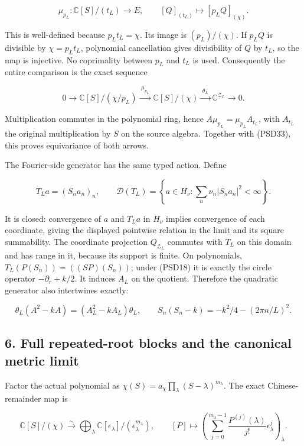 \[
\mu_{p_L}:\mathbb{C}[S]/(t_L)\longrightarrow E,
\qquad [Q]_{(t_L)}\longmapsto[p_LQ]_{(\chi)}.
\tag{PSD33a}
\]

This is well-defined because \(p_L t_L=\chi\). Its image is \((p_L)/(\chi)\). If \(p_LQ\) is divisible by \(\chi=p_Lt_L\), polynomial cancellation gives divisibility of \(Q\) by \(t_L\), so the map is injective. No coprimality between \(p_L\) and \(t_L\) is used. Consequently the entire comparison is the exact sequence

\[
0\longrightarrow\mathbb{C}[S]/(\chi/p_L)
\xrightarrow{\;\mu_{p_L}\;}\mathbb{C}[S]/(\chi)
\xrightarrow{\;\theta_L\;}\mathbb{C}^{\mathcal Z_L}
\longrightarrow0.
\tag{PSD33b}
\]

Multiplication commutes in the polynomial ring, hence \(A\mu_{p_L}=\mu_{p_L}A_{t_L}\), with \(A_{t_L}\) the original multiplication by \(S\) on the source algebra. Together with (PSD33), this proves equivariance of both arrows.

The Fourier-side generator has the same typed action. Define

\[
T_La=(S_na_n)_n,\qquad
\mathcal D(T_L)=\left\{a\in H_\nu:\sum_n\nu_n|S_na_n|^2<\infty\right\}.
\tag{PSD33c}
\]

It is closed: convergence of \(a\) and \(T_La\) in \(H_\nu\) implies convergence of each coordinate, giving the displayed pointwise relation in the limit and its square summability. The coordinate projection \(Q_{\mathcal Z_L}\) commutes with \(T_L\) on this domain and has range in it, because its support is finite. On polynomials, \(T_L(P(S_n))=((SP)(S_n))\); under (PSD18) it is exactly the circle operator \(-\partial_r+k/2\). It induces \(A_L\) on the quotient. Therefore the quadratic generator also intertwines exactly:

\[
\theta_L(A^2-kA)=(A_L^2-kA_L)\theta_L,
\qquad S_n(S_n-k)=-k^2/4-(2\pi n/L)^2.
\tag{PSD33d}
\]

\subsection{6. Full repeated-root blocks and the canonical metric limit}\label{GraphV2:full-repeated-root-blocks-and-the-canonical-metric-limit}

Factor the actual polynomial as \(\chi(S)=a_\chi\prod_\lambda(S-\lambda)^{m_\lambda}\). The exact Chinese-remainder map is

\[
\mathbb{C}[S]/(\chi)\xrightarrow{\sim}
\bigoplus_\lambda\mathbb{C}[\epsilon_\lambda]/(\epsilon_\lambda^{m_\lambda}),
\qquad
[P]\longmapsto
\left(\sum_{j=0}^{m_\lambda-1}\frac{P^{(j)}(\lambda)}{j!}\epsilon_\lambda^j\right)_\lambda.
\tag{PSD34}
\]

